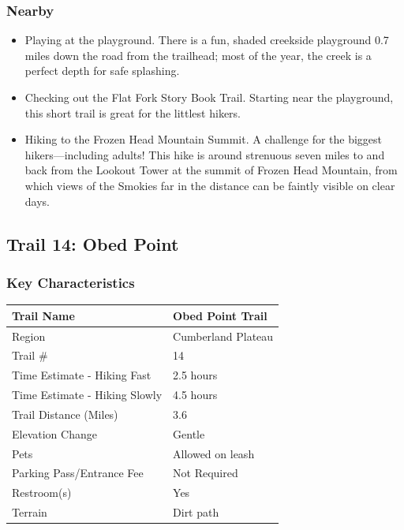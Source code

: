 \documentclass[
  letterpaper,
  DIV=11,
  numbers=noendperiod]{scrartcl}
\providecommand{\tightlist}{%
  \setlength{\itemsep}{0pt}\setlength{\parskip}{0pt}}\usepackage{longtable,booktabs,array}
\begin{document}
\hypertarget{nearby-12}{%
\subsubsection{Nearby}\label{nearby-12}}

\begin{itemize}
\tightlist
\item
  Playing at the playground. There is a fun, shaded creekside playground
  0.7 miles down the road from the trailhead; most of the year, the
  creek is a perfect depth for safe splashing.
\item
  Checking out the Flat Fork Story Book Trail. Starting near the
  playground, this short trail is great for the littlest hikers.
\item
  Hiking to the Frozen Head Mountain Summit. A challenge for the biggest
  hikers---including adults! This hike is around strenuous seven miles
  to and back from the Lookout Tower at the summit of Frozen Head
  Mountain, from which views of the Smokies far in the distance can be
  faintly visible on clear days.
\end{itemize}

\hypertarget{trail-14-obed-point}{%
\subsection{Trail 14: Obed Point}\label{trail-14-obed-point}}

\hypertarget{key-characteristics-13}{%
\subsubsection{Key Characteristics}\label{key-characteristics-13}}

\begin{longtable}[]{@{}ll@{}}
\toprule\noalign{}
Trail Name & Obed Point Trail \\
\midrule\noalign{}
\endhead
\bottomrule\noalign{}
\endlastfoot
Region & Cumberland Plateau \\
Trail \# & 14 \\
Time Estimate - Hiking Fast & 2.5 hours \\
Time Estimate - Hiking Slowly & 4.5 hours \\
Trail Distance (Miles) & 3.6 \\
Elevation Change & Gentle \\
Pets & Allowed on leash \\
Parking Pass/Entrance Fee & Not Required \\
Restroom(s) & Yes \\
Terrain & Dirt path \\
\end{longtable}
\end{document}
